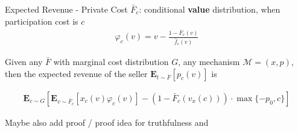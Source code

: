 \documentclass{beamer}
\begin{document}
\begin{frame}{Expected Revenue - Private Cost}
  $\bar{F}_c$: conditional \textbf{value} distribution, when participation cost is $c$
  \begin{align*}
    \varphi_c(v) = v - \frac{1- \bar{F}_c(v)}{\hat{f}_c(v)}
  \end{align*}

  \begin{theorem}
    Given any $\bar{F}$ with marginal cost distribution $G$, any mechanism $\mathcal{M}=(x,p)$, then the expected revenue of the seller $\mathbf{E}_{t \sim \bar{F}}\left[p_c(v)\right] $ is

    \begin{align*}
      \mathbf{E}_{c \sim G}\left[\mathbf{E}_{v\sim\bar{F}_c}\left[x_c(v)\varphi_c(v)\right] - (1-\bar{F}_c(v_x(c))) \cdot \max\{-p_0,c\}\right]
    \end{align*}
  \end{theorem}

  Maybe also add proof / proof idea for truthfulness and 
\end{frame}
\end{document}
